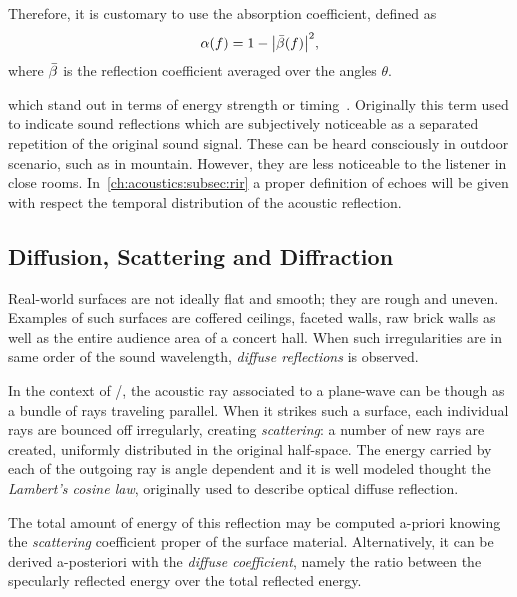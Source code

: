 Therefore, it is customary to use the absorption coefficient, defined as
\begin{equation}
    \absCoeff(f) = 1 - \abs{\bar{\reflCoeff}(f)}^2
    ,
\end{equation}
where $\bar{\beta}$ is the reflection coefficient averaged over the angles $\theta$.

 which stand out in terms of energy strength or timing~.
Originally this term used to indicate sound reflections which are subjectively noticeable as a separated repetition of the original sound signal.
These can be heard consciously in outdoor scenario, such as in mountain. However, they are less noticeable to the listener in close rooms.
In~\cref{ch:acoustics:subsec:rir} a proper definition of echoes will be given with respect the temporal distribution of the acoustic reflection.



\subsection{Diffusion, Scattering and Diffraction}
Real-world surfaces are not ideally flat and smooth; they are rough and uneven.
Examples of such surfaces are coffered ceilings, faceted walls, raw brick walls as well as the entire audience area of a concert hall.
When such irregularities are in same order of the sound wavelength, \textit{diffuse reflections} is observed.

In the context of \GA/, the acoustic ray associated to a plane-wave can be though as a bundle of rays traveling parallel.
When it strikes such a surface, each individual rays are bounced off irregularly, creating \textit{scattering}:
a number of new rays are created, uniformly distributed in the original half-space.
The energy carried by each of the outgoing ray is angle dependent and it
is well modeled thought the \textit{Lambert's cosine law}, originally used to describe optical diffuse reflection.

The total amount of energy of this reflection may be computed a-priori
knowing the \textit{scattering} coefficient proper of the surface material.
Alternatively, it can be derived a-posteriori with the \textit{diffuse coefficient}, namely the ratio between
the specularly reflected energy over the total reflected energy.


